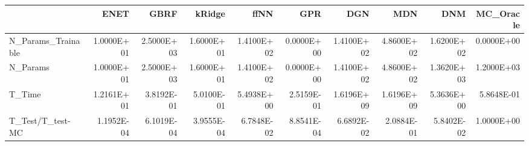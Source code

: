 \begin{tabular}{lrrrrrrrrr}
\toprule
{} &       ENET &       GBRF &     kRidge &       ffNN &        GPR &        DGN &        MDN &        DNM &  MC\_Oracle \\
\midrule
N\_Params\_Trainable & 1.0000E+01 & 2.5000E+03 & 1.6000E+01 & 1.4100E+02 & 0.0000E+00 & 1.4100E+02 & 4.8600E+02 & 1.6200E+02 & 0.0000E+00 \\
N\_Params           & 1.0000E+01 & 2.5000E+03 & 1.6000E+01 & 1.4100E+02 & 0.0000E+00 & 1.4100E+02 & 4.8600E+02 & 1.3620E+03 & 1.2000E+03 \\
T\_Time             & 1.2161E+01 & 3.8192E-01 & 5.0100E-01 & 5.4938E+00 & 2.5159E-01 & 1.6196E+09 & 1.6196E+09 & 5.3636E+00 & 5.8648E-01 \\
T\_Test/T\_test-MC   & 1.1952E-04 & 6.1019E-04 & 3.9555E-04 & 6.7848E-02 & 8.8541E-04 & 6.6892E-02 & 2.0884E-01 & 5.8402E-02 & 1.0000E+00 \\
\bottomrule
\end{tabular}

